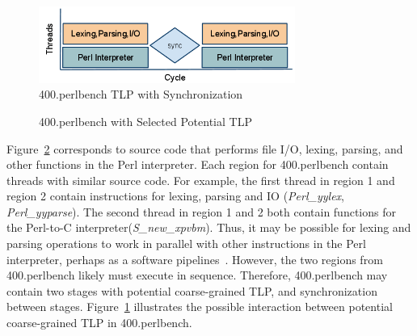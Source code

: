 \documentclass[defaultstyle,11pt]{thesis}
\begin{document}
\begin{figure}
  \centering
  \includegraphics[width=8.4cm]{images/400perlillust}
  \caption{400.perlbench TLP with Synchronization}
  \label{fig:400perlillust}
\end{figure}

\begin{figure}
  \centering
  \hspace{5mm}
  \caption{400.perlbench with Selected Potential TLP}
  \label{fig:400perlselInDoc}
\end{figure}

Figure~\ref{fig:400perlselInDoc} corresponds to source code that
performs file I/O, lexing, parsing, and other functions in the Perl
interpreter. Each region for 400.perlbench contain threads with
similar source code.  For example, the first thread in region 1 and
region 2 contain instructions for lexing, parsing and IO
(\textit{Perl\_yylex}, \textit{Perl\_yyparse}).  The second thread in
region 1 and 2 both contain functions for the Perl-to-C
interpreter(\textit{S\_new\_xpvbm}). Thus, it may be possible for
lexing and parsing operations to work in parallel with other
instructions in the Perl interpreter, perhaps as a software
pipelines~\cite{Allan:1995rt,giacomoni:08:ppopp}. However, the two
regions from 400.perlbench likely must execute in sequence.
Therefore, 400.perlbench may contain two stages with potential
coarse-grained TLP, and synchronization between
stages. Figure~\ref{fig:400perlillust} illustrates the possible
interaction between potential coarse-grained TLP in 400.perlbench.
\end{document}
